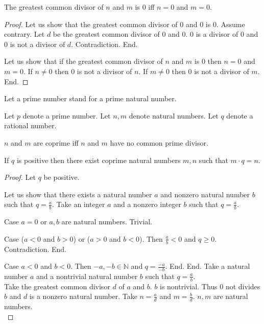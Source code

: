 \documentclass{article}
\begin{document}
\begin{forthel}

\begin{lemma}
The greatest common divisor of $n$ and $m$ is 0 iff $n = 0$ and $m = 0$.
\end{lemma}
\begin{proof}
Let us show that the greatest common divisor of 0 and 0 is 0.
  Assume contrary. Let $d$ be the greatest common divisor of 0 and 0. 
  0 is a divisor of 0 and 0 is not a divisor of $d$. Contradiction. End.

Let us show that if the greatest common divisor of $n$ and $m$ is 0 then $n = 0$ and $m = 0$.
  If $n \neq 0$ then 0 is not a divisor of $n$.
  If $m \neq 0$ then 0 is not a divisor of $m$.
End.
\end{proof}

  Let a prime number stand for a prime natural number.

    Let $p$ denote a prime number.
    Let $n,m$ denote natural numbers.
    Let $q$ denote a rational number.

    \begin{definition}
      $n$ and $m$ are coprime iff $n$ and $m$ have no common prime divisor.
    \end{definition}

    \begin{lemma}
      If $q$ is positive then there exist coprime natural numbers $m,n$ such that $m \cdot q = n$.
    \end{lemma}
\begin{proof}
Let $q$ be positive. 

Let us show that there exists a natural number $a$ and nonzero natural number $b$ such that $q = \frac{a}{b}$.
  Take an integer $a$ and a nonzero integer $b$ such that $q = \frac{a}{b}$.
  
  Case $a = 0$ or $a,b$ are natural numbers. Trivial.
  
  Case ($a < 0$ and $b > 0$) or ($a > 0$ and $b < 0$). Then $\frac{a}{b} < 0$ and $q \geq 0$. Contradiction. End.
  
  Case $a < 0$ and $b < 0$. Then $-a,-b \in \mathbb{N}$ and $q = \frac{-a}{-b}$. End.
End.
Take a natural number $a$ and a nontrivial natural number $b$ such that $q = \frac{a}{b}$.\\

Take the greatest common divisor $d$ of $a$ and $b$. $b$ is nontrivial. Thus 0 not divides $b$ and $d$ is a nonzero natural number. 
Take $n = \frac{a}{d}$ and $m = \frac{b}{d}$. $n,m$ are natural numbers.\\


\end{proof}
\end{forthel}
\end{document}
